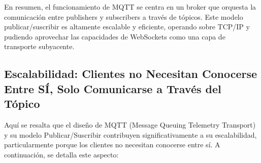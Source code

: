 \documentclass{report}
\begin{document}
En resumen, el funcionamiento de MQTT se centra en un broker que orquesta la comunicación entre publishers y subscribers a través 
de tópicos. Este modelo publicar/suscribir es altamente escalable y eficiente, operando sobre TCP/IP y pudiendo aprovechar 
las capacidades de WebSockets como una capa de transporte subyacente.

\subsection{Escalabilidad: Clientes no Necesitan Conocerse Entre SÍ, Solo Comunicarse a Través del Tópico}
Aquí se resalta que el diseño de MQTT (Message Queuing Telemetry Transport) y su modelo Publicar/Suscribir 
contribuyen significativamente a su escalabilidad, particularmente porque los clientes no necesitan conocerse entre sí.
A continuación, se detalla este aspecto:
\end{document}
